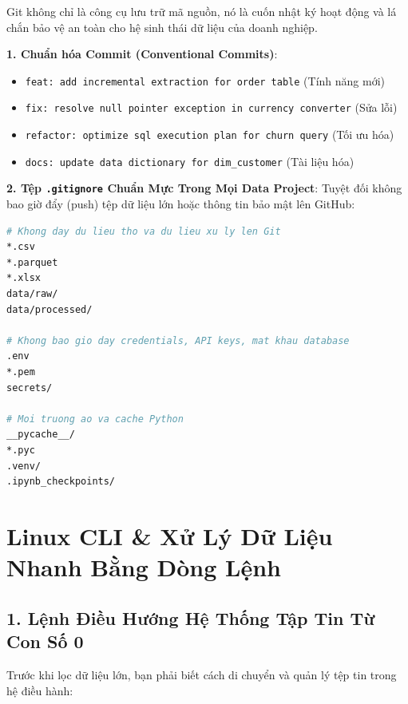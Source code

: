 Git không chỉ là công cụ lưu trữ mã nguồn, nó là cuốn nhật ký hoạt động và lá chắn bảo vệ an toàn cho hệ sinh thái dữ liệu của doanh nghiệp.

\begin{thuchanhbox}
\textbf{1. Chuẩn hóa Commit (Conventional Commits)}:
\begin{itemize}
    \item \texttt{feat: add incremental extraction for order table} (Tính năng mới)
    \item \texttt{fix: resolve null pointer exception in currency converter} (Sửa lỗi)
    \item \texttt{refactor: optimize sql execution plan for churn query} (Tối ưu hóa)
    \item \texttt{docs: update data dictionary for dim\_customer} (Tài liệu hóa)
\end{itemize}

\textbf{2. Tệp \texttt{.gitignore} Chuẩn Mực Trong Mọi Data Project}:
Tuyệt đối không bao giờ đẩy (push) tệp dữ liệu lớn hoặc thông tin bảo mật lên GitHub:
\begin{lstlisting}[language=bash]
# Khong day du lieu tho va du lieu xu ly len Git
*.csv
*.parquet
*.xlsx
data/raw/
data/processed/

# Khong bao gio day credentials, API keys, mat khau database
.env
*.pem
secrets/

# Moi truong ao va cache Python
__pycache__/
*.pyc
.venv/
.ipynb_checkpoints/
\end{lstlisting}
\end{thuchanhbox}

\section{Linux CLI \& Xử Lý Dữ Liệu Nhanh Bằng Dòng Lệnh}

\subsection{1. Lệnh Điều Hướng Hệ Thống Tập Tin Từ Con Số 0}
Trước khi lọc dữ liệu lớn, bạn phải biết cách di chuyển và quản lý tệp tin trong hệ điều hành:

